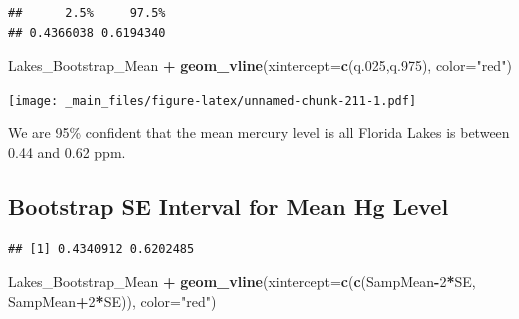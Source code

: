 \documentclass[]{book}
\newenvironment{Shaded}{\begin{snugshade}}{\end{snugshade}}
\newcommand{\KeywordTok}[1]{\textcolor[rgb]{0.13,0.29,0.53}{\textbf{#1}}}
\newcommand{\DataTypeTok}[1]{\textcolor[rgb]{0.13,0.29,0.53}{#1}}
\newcommand{\DecValTok}[1]{\textcolor[rgb]{0.00,0.00,0.81}{#1}}
\newcommand{\StringTok}[1]{\textcolor[rgb]{0.31,0.60,0.02}{#1}}
\newcommand{\OperatorTok}[1]{\textcolor[rgb]{0.81,0.36,0.00}{\textbf{#1}}}
\newcommand{\NormalTok}[1]{#1}
\begin{document}
\begin{verbatim}
##      2.5%     97.5% 
## 0.4366038 0.6194340
\end{verbatim}

\begin{Shaded}
\begin{Highlighting}[]
\NormalTok{Lakes_Bootstrap_Mean  }\OperatorTok{+}\StringTok{ }\KeywordTok{geom_vline}\NormalTok{(}\DataTypeTok{xintercept=}\KeywordTok{c}\NormalTok{(q.}\DecValTok{025}\NormalTok{,q.}\DecValTok{975}\NormalTok{), }\DataTypeTok{color=}\StringTok{"red"}\NormalTok{) }
\end{Highlighting}
\end{Shaded}

\texttt{[image: \_main\_files/figure-latex/unnamed-chunk-211-1.pdf]}

We are 95\% confident that the mean mercury level is all Florida Lakes
is between 0.44 and 0.62 ppm.

\subsection{Bootstrap SE Interval for Mean Hg
Level}\label{bootstrap-se-interval-for-mean-hg-level}

\begin{Shaded}
\end{Shaded}

\begin{verbatim}
## [1] 0.4340912 0.6202485
\end{verbatim}

\begin{Shaded}
\begin{Highlighting}[]
\NormalTok{Lakes_Bootstrap_Mean  }\OperatorTok{+}\StringTok{ }\KeywordTok{geom_vline}\NormalTok{(}\DataTypeTok{xintercept=}\KeywordTok{c}\NormalTok{(}\KeywordTok{c}\NormalTok{(SampMean}\OperatorTok{-}\DecValTok{2}\OperatorTok{*}\NormalTok{SE, SampMean}\OperatorTok{+}\DecValTok{2}\OperatorTok{*}\NormalTok{SE)), }\DataTypeTok{color=}\StringTok{"red"}\NormalTok{) }
\end{Highlighting}
\end{Shaded}
\end{document}
